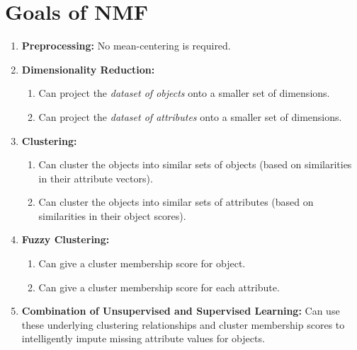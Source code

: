 \documentclass[11pt]{elegantbook}
\begin{document}
\section{Goals of NMF}
\begin{enumerate}[(1.)]
    \item \textbf{Preprocessing:} No mean-centering is required.
    \item \textbf{Dimensionality Reduction:}
    \begin{enumerate}[$\bullet$]
        \item Can project the \textit{dataset of objects} onto a smaller set of dimensions.
        \item Can project the \textit{dataset of attributes} onto a smaller set of dimensions.
    \end{enumerate}
    \item \textbf{Clustering:}
    \begin{enumerate}[$\bullet$]
        \item Can cluster the objects into similar sets of objects (based on similarities in their
        attribute vectors).
        \item Can cluster the objects into similar sets of attributes (based on similarities in their
        object scores).
    \end{enumerate}
    \item \textbf{Fuzzy Clustering:}
    \begin{enumerate}[$\bullet$]
        \item Can give a cluster membership score for object.
        \item Can give a cluster membership score for each attribute.
    \end{enumerate}
    \item \textbf{Combination of Unsupervised and Supervised Learning:} Can use these underlying clustering relationships and cluster membership scores to intelligently impute missing attribute values for objects.
\end{enumerate}
\end{document}
